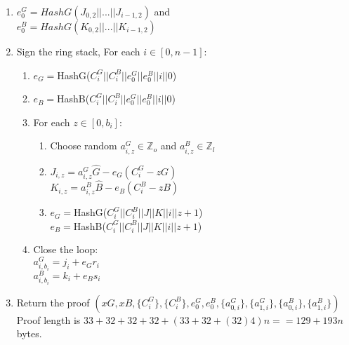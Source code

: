 \documentclass[a4paper]{article}
\begin{document}
\begin{enumerate}
\begin{enumerate}
        \end{enumerate}
    \item $e^{G}_{0} = HashG(J_{0,2}||...||J_{i-1,2})$ and\\
        $e^{B}_{0} = HashG(K_{0,2}||...||K_{i-1,2})$
    \item Sign the ring stack, For each $i \in [0, n-1]$:
        \begin{enumerate}
            \item $e_{G} = $HashG($C^{G}_{i}||C^{B}_{i}||e^{G}_{0}||e^{B}_{0}||i||0$)
            \item $e_{B} = $HashB($C^{G}_{i}||C^{B}_{i}||e^{G}_{0}||e^{B}_{0}||i||0$)
            \item For each $z \in [0, b_{i}]$:
                \begin{enumerate}
                    \item Choose random $a^{G}_{i,z} \in \mathbb{Z}_{o} $ and $ a^{B}_{i,z} \in \mathbb{Z}_{l}$
                    \item $J_{i,z} = a^{G}_{i,z}\hat{G} - e_{G}(C^{G}_{i} - zG)$\\
                          $K_{i,z} = a^{B}_{i,z}\hat{B} - e_{B}(C^{B}_{i} - zB)$
                    \item $e_{G} = $HashG($C^{G}_{i}||C^{B}_{i}||J||K||i||z+1$)\\
                          $e_{B} = $HashB($C^{G}_{i}||C^{B}_{i}||J||K||i||z+1$)
                \end{enumerate}
            \item Close the loop:\\
                $a^{G}_{i,b_{i}} = j_{i} + e_{G}r_{i}$\\
                $a^{B}_{i,b_{i}} = k_{i} + e_{B}s_{i}$
        \end{enumerate}
    \item Return the proof $(xG, xB, \{C^{G}_{i}\}, \{C^{B}_{i}\}, e^{G}_{0}, e^{B}_{0}, \{a^{G}_{0, i}\}, \{a^{G}_{1, i}\}, \{a^{B}_{0, i}\}, \{a^{B}_{1, i}\})$\\
        Proof length is $33+32+32+32+(33+32+(32)4)n == 129+193n$ bytes.
\end{enumerate}
\end{document}
